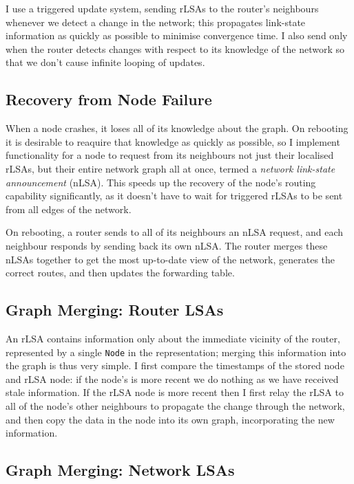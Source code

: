 \documentclass[withindex,glossary,openany]{cam-thesis}
\begin{document}
I use a triggered update system, sending rLSAs to the router's neighbours whenever we detect a change in the network;  this propagates link-state information as quickly as possible to minimise convergence time. I also send only when the router detects changes with respect to its knowledge of the network so that we don't cause infinite looping of updates.

\subsection{Recovery from Node Failure}
\label{subsec:node_failure}

When a node crashes, it loses all of its knowledge about the graph. On rebooting it is desirable to reaquire that knowledge as quickly as possible, so I implement functionality for a node to request from its neighbours not just their localised rLSAs, but their entire network graph all at once, termed a \textit{network link-state announcement} (nLSA). This speeds up the recovery of the node's routing capability significantly, as it doesn't have to wait for triggered rLSAs to be sent from all edges of the network.

On rebooting, a router sends to all of its neighbours an nLSA request, and each neighbour responds by sending back its own nLSA. The router merges these nLSAs together to get the most up-to-date view of the network, generates the correct routes, and then updates the forwarding table.

\subsection{Graph Merging: Router LSAs}
\label{subsec:merge_rlsa}

An rLSA contains information only about the immediate vicinity of the router, represented by a single \texttt{Node} in the representation; merging this information into the graph is thus very simple. I first compare the timestamps of the stored node and rLSA node: if the node's is more recent we do nothing as we have received stale information. If the rLSA node is more recent then I first relay the rLSA to all of the node's other neighbours to propagate the change through the network, and then copy the data in the node into its own graph, incorporating the new information.

\subsection{Graph Merging: Network LSAs}
\label{subsec:merge_nlsa}
\end{document}
